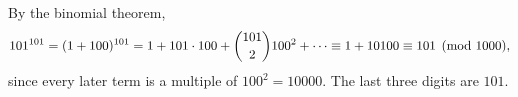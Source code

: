 By the binomial theorem,
\[101^{101}=(1+100)^{101}=1+101\cdot100+\dbinom{101}{2}100^2+\cdots\equiv1+10100\equiv101\pmod{1000},\]
since every later term is a multiple of $100^2=10000$. The last three digits are $\boxed{101}$.
